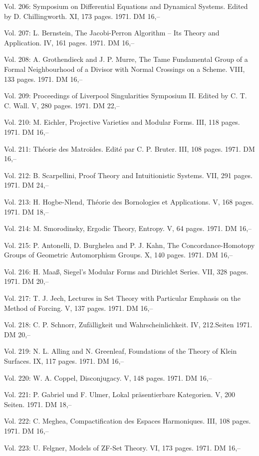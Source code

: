 Vol. 206: Symposium on Differential Equations and Dynamical Systems. Edited by D. Chillingworth. XI, 173 pages. 1971. DM 16,--

Vol. 207: L. Bernstein, The Jacobi-Perron Algorithm -- Its Theory and Application. IV, 161 pages. 1971. DM 16,--

Vol. 208: A. Grothendieck and J. P. Murre, The Tame Fundamental Group of a Formal Neighbourhood of a Divisor with Normal Crossings on a Scheme. VIII, 133 pages. 1971. DM 16,--

Vol. 209: Proceedings of Liverpool Singularities \quad Symposium II. Edited by C. T. C. Wall. V, 280 pages. 1971. DM 22,--

Vol. 210: M. Eichler, Projective Varieties and Modular Forms. III, 118 pages. 1971. DM 16,--

Vol. 211: Théorie des Matroïdes. Edité par C. P. Bruter. III, 108 pages. 1971. DM 16,--

Vol. 212: B. Scarpellini, Proof Theory and Intuitionistic Systems. VII, 291 pages. 1971. DM 24,--

Vol. 213: H. Hogbe-Nlend, Théorie des Bornologies et Applications. V, 168 pages. 1971. DM 18,--

Vol. 214: M. Smorodinsky, Ergodic Theory, Entropy. V, 64 pages. 1971. DM 16,--

Vol. 215: P. Antonelli, D. Burghelea and P. J. Kahn, The Concordance-Homotopy Groups of Geometric Automorphism Groups. X, 140 pages. 1971. DM 16,--

Vol. 216: H. Maaß, Siegel's Modular Forms and Dirichlet Series. VII, 328 pages. 1971. DM 20,--

Vol. 217: T. J. Jech, Lectures in Set Theory with Particular Emphasis on the Method of Forcing. V, 137 pages. 1971. DM 16,--

Vol. 218: C. P. Schnorr, Zufälligkeit und Wahrscheinlichkeit. IV, 212.Seiten 1971. DM 20,--

Vol. 219: N. L. Alling and N. Greenleaf, Foundations of the Theory of Klein Surfaces. IX, 117 pages. 1971. DM 16,--

Vol. 220: W. A. Coppel, Disconjugacy. V, 148 pages. 1971. DM 16,--

Vol. 221: P. Gabriel und F. Ulmer, Lokal präsentierbare Kategorien. V, 200 Seiten. 1971. DM 18,--

Vol. 222: C. Meghea, Compactification des Espaces Harmoniques. III, 108 pages. 1971. DM 16,--

Vol. 223: U. Felgner, Models of ZF-Set Theory. VI, 173 pages. 1971. DM 16,--

